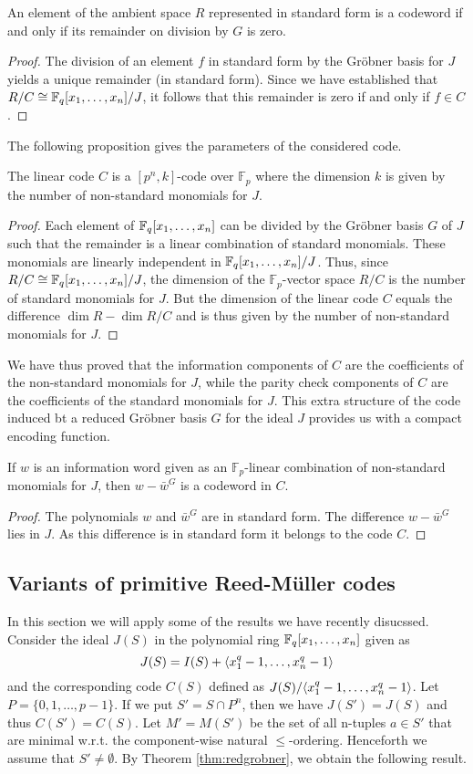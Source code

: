 \documentclass[english,bachelor]{liumaiex}
\begin{document}
\begin{prop}
An element of the ambient space $R$ represented in standard form is a codeword if and only if its remainder on division by $G$ is zero.
\end{prop}
\begin{proof}
The division of an element $f$ in standard form by the Gröbner basis for $J$ yields a unique remainder (in standard form). Since we have established that $R/C\cong\mathbb{F}_q[x_1,\dots,x_n]/J$, it follows that this remainder is zero if and only if $f\in C$.
\end{proof}
The following proposition gives the parameters of the considered code.
\begin{prop}
The linear code $C$ is a $[p^n,k]$-code over $\mathbb{F}_p$ where the dimension $k$ is given by the number of non-standard monomials for $J$.
\end{prop}
\begin{proof}
Each element of $\mathbb{F}_q[x_1,\dots,x_n]$ can be divided by the Gröbner basis $G$ of $J$ such that the remainder is a linear combination of standard monomials. These monomials are linearly independent in $\mathbb{F}_q[x_1,\dots,x_n]/J$. Thus, since $R/C\cong\mathbb{F}_q[x_1,\dots,x_n]/J$, the dimension of the $\mathbb{F}_p$-vector space $R/C$ is the number of standard monomials for $J$. But the dimension of the linear code $C$ equals the difference $\dim R-\dim R/C$ and is thus given by the number of non-standard monomials for $J$.
\end{proof}
We have thus proved that the information components of $C$ are the coefficients of the non-standard monomials for $J$, while the parity check components of $C$ are the coefficients of the standard monomials for $J$. This extra structure of the code induced bt a reduced Gröbner basis $G$ for the ideal $J$ provides us with a compact encoding function.
\begin{prop}
If $w$ is an information word given as an $\mathbb{F}_p$-linear combination of non-standard monomials for $J$, then $w-\bar{w}^G$ is a codeword in $C$.
\end{prop}
\begin{proof}
The polynomials $w$ and $\bar{w}^G$ are in standard form. The difference $w-\bar{w}^G$ lies in $J$. As this difference is in standard form it belongs to the code $C$.
\end{proof}
\subsection{Variants of primitive Reed-M{\"u}ller codes}
In this section we will apply some of the results we have recently disucssed. Consider the ideal $J(S)$ in the polynomial ring $\mathbb{F}_q[x_1,\dots,x_n]$ given as
\begin{displaymath}
J(S)=I(S)+\langle x_1^q-1,\dots,x_n^q-1\rangle
\end{displaymath}
and the corresponding code $C(S)$ defined as $J(S)/\langle x_1^q-1,\dots,x_n^q-1\rangle$. Let $P = \{0,1,\dots,p-1\}$. If we put $S'=S\cap P^n$, then we have $J(S')=J(S)$ and thus $C(S')=C(S)$. Let $M'=M(S')$ be the set of all n-tuples $a\in S'$ that are minimal w.r.t. the component-wise natural $\leq$-ordering. Henceforth we assume that $S'\neq\emptyset$. By Theorem \ref{thm:redgrobner}, we obtain the following result.
\end{document}
